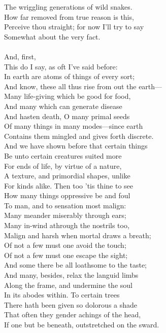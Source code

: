 The wriggling generations of wild snakes.\\
How far removed from true reason is this,\\
Perceive thou straight; for now I'll try to say\\
Somewhat about the very fact.\\
\\
And, first,\\
This do I say, as oft I've said before:\\
In earth are atoms of things of every sort;\\
And know, these all thus rise from out the earth—\\
Many life-giving which be good for food,\\
And many which can generate disease\\
And hasten death, O many primal seeds\\
Of many things in many modes—since earth\\
Contains them mingled and gives forth discrete.\\
And we have shown before that certain things\\
Be unto certain creatures suited more\\
For ends of life, by virtue of a nature,\\
A texture, and primordial shapes, unlike\\
For kinds alike. Then too 'tis thine to see\\
How many things oppressive be and foul\\
To man, and to sensation most malign:\\
Many meander miserably through ears;\\
Many in-wind athrough the nostrils too,\\
Malign and harsh when mortal draws a breath;\\
Of not a few must one avoid the touch;\\
Of not a few must one escape the sight;\\
And some there be all loathsome to the taste;\\
And many, besides, relax the languid limbs\\
Along the frame, and undermine the soul\\
In its abodes within. To certain trees\\
There hath been given so dolorous a shade\\
That often they gender achings of the head,\\
If one but be beneath, outstretched on the sward.\\
